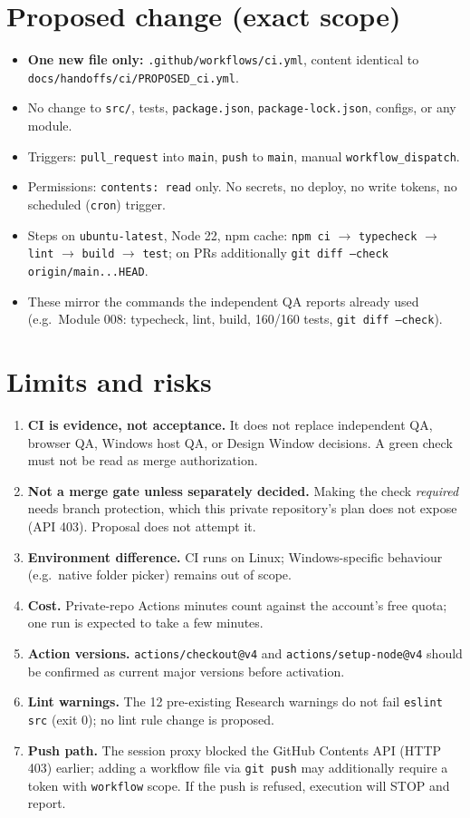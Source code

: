 \documentclass[11pt,a4paper]{article}
\begin{document}
\section{Proposed change (exact scope)}
\begin{itemize}[nosep]
  \item \textbf{One new file only:} \texttt{.github/workflows/ci.yml}, content identical to \texttt{docs/handoffs/ci/PROPOSED\_ci.yml}.
  \item No change to \texttt{src/}, tests, \texttt{package.json}, \texttt{package-lock.json}, configs, or any module.
  \item Triggers: \texttt{pull\_request} into \texttt{main}, \texttt{push} to \texttt{main}, manual \texttt{workflow\_dispatch}.
  \item Permissions: \texttt{contents: read} only. No secrets, no deploy, no write tokens, no scheduled (\texttt{cron}) trigger.
  \item Steps on \texttt{ubuntu-latest}, Node 22, npm cache: \texttt{npm ci} $\to$ \texttt{typecheck} $\to$ \texttt{lint} $\to$ \texttt{build} $\to$ \texttt{test}; on PRs additionally \texttt{git diff --check origin/main...HEAD}.
  \item These mirror the commands the independent QA reports already used (e.g.\ Module 008: typecheck, lint, build, 160/160 tests, \texttt{git diff --check}).
\end{itemize}

\section{Limits and risks}
\begin{enumerate}[nosep]
  \item \textbf{CI is evidence, not acceptance.} It does not replace independent QA, browser QA, Windows host QA, or Design Window decisions. A green check must not be read as merge authorization.
  \item \textbf{Not a merge gate unless separately decided.} Making the check \emph{required} needs branch protection, which this private repository's plan does not expose (API 403). Proposal does not attempt it.
  \item \textbf{Environment difference.} CI runs on Linux; Windows-specific behaviour (e.g.\ native folder picker) remains out of scope.
  \item \textbf{Cost.} Private-repo Actions minutes count against the account's free quota; one run is expected to take a few minutes.
  \item \textbf{Action versions.} \texttt{actions/checkout@v4} and \texttt{actions/setup-node@v4} should be confirmed as current major versions before activation.
  \item \textbf{Lint warnings.} The 12 pre-existing Research warnings do not fail \texttt{eslint src} (exit 0); no lint rule change is proposed.
  \item \textbf{Push path.} The session proxy blocked the GitHub Contents API (HTTP 403) earlier; adding a workflow file via \texttt{git push} may additionally require a token with \texttt{workflow} scope. If the push is refused, execution will STOP and report.
\end{enumerate}
\end{document}
